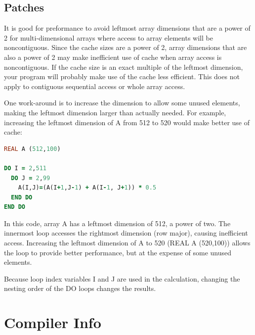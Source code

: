 \documentclass[11pt]{book} %
\begin{document}
\subsection{Patches}

It is good for preformance to avoid leftmost array dimensions that are a power of 2 for multi-dimensional arrays where access to array elements will be noncontiguous. Since the cache sizes are a power of 2, array dimensions that are also a power of 2 may make inefficient use of cache when array access is noncontiguous. If the cache size is an exact multiple of the leftmost dimension, your program will probably make use of the cache less efficient. This does not apply to contiguous sequential access or whole array access.

One work-around is to increase the dimension to allow some unused elements, making the leftmost dimension larger than actually needed. For example, increasing the leftmost dimension of A from 512 to 520 would make better use of cache:
\begin{lstlisting}[language=Fortran, caption=Patch example]
REAL A (512,100)

DO I = 2,511
  DO J = 2,99
    A(I,J)=(A(I+1,J-1) + A(I-1, J+1)) * 0.5
  END DO
END DO
\end{lstlisting}

In this code, array A has a leftmost dimension of 512, a power of two. The innermost loop accesses the rightmost dimension (row major), causing inefficient access. Increasing the leftmost dimension of A to 520 (REAL A (520,100)) allows the loop to provide better performance, but at the expense of some unused elements.

Because loop index variables I and J are used in the calculation, changing the nesting order of the DO loops changes the results.

\section{Compiler Info}
\end{document}
